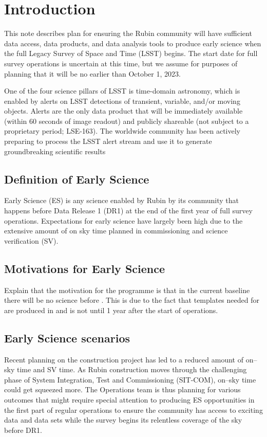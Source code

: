 \section{Introduction}

This  note describes plan for ensuring the Rubin community will have sufficient data access, data products, and data analysis tools to produce early science when the full Legacy Survey of Space and Time (LSST)  begins. The start date for full survey operations is uncertain at this time, but we assume for purposes of planning that it will be no earlier than October 1, 2023. 

One of the four science pillars of LSST is time-domain astronomy, which is enabled by alerts
on LSST detections of transient, variable, and/or moving objects. 
Alerts are the only data product that will be immediately available (within 60 seconds of image readout) and publicly
shareable (not subject to a proprietary period; LSE-163). 
The worldwide community has been actively preparing to process the LSST alert stream and use it to generate groundbreaking scientific results 

\subsection{Definition of Early Science}  \label{ssec:defn}

Early Science (ES) is any science enabled by Rubin by its community that happens before Data Release 1 (DR1) at the end of the first year of full survey operations. Expectations for early science have largely been high due to the extensive amount of on sky time planned in commissioning and science verification (SV).  

\subsection{Motivations for Early Science}
Explain that the motivation for the \es programme is that in the current baseline there will be no science before \drone. 
This is due to the fact that templates needed for \diffim are produced in \drp and \drone is not until 1 year after the start of operations. 

\subsection{Early Science scenarios } \label{ssec:scenarios}
Recent planning on the construction project has led to a reduced amount of on--sky time and SV time.
As Rubin construction moves through the challenging phase of System Integration, Test and Commissioning (SIT-COM), on--sky time could get squeezed more. The Operations team is thus planning for various outcomes that might require special attention to producing ES opportunities in the first part of regular operations to ensure the community has access to exciting data and data sets while the survey begins its relentless coverage of the sky before DR1.

